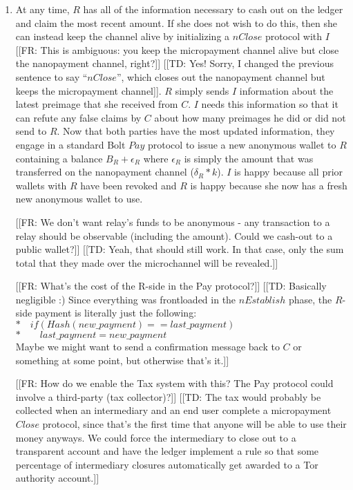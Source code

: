 \documentclass{article}
\newcommand{\flo}[1]{ {\color{blue} [[FR: #1]]}}
\newcommand{\dinh}[1]{ {\color{brown} [[TD: #1]]}}
\begin{document}
\begin{enumerate}
\item At any time, $R$ has all of the information necessary to cash out on the ledger and claim the most recent amount. If she does not wish to do this, then she can instead keep the channel alive by initializing a $nClose$ protocol with $I$ \flo{This is ambiguous: you keep the micropayment channel alive but close the nanopayment channel, right?} \dinh{Yes! Sorry, I changed the previous sentence to say ``$nClose$'', which closes out the nanopayment channel but keeps the micropayment channel}. $R$ simply sends $I$ information about the latest preimage that she received from $C$. $I$ needs this information so that it can refute any false claims by $C$ about how many preimages he did or did not send to $R$. Now that both parties have the most updated information, they engage in a standard Bolt $Pay$ protocol to issue a new anonymous wallet to $R$ containing a balance $B_R + \epsilon_R$ where $\epsilon_R$ is simply the amount that was transferred on the nanopayment channel ($\delta_R * k$). $I$ is happy because all prior wallets with $R$ have been revoked and $R$ is happy because she now has a fresh new anonymous wallet to use.

\flo{We don't want relay's funds to be anonymous - any transaction to a relay should be observable (including the amount). Could we cash-out to a public wallet?}
\dinh{Yeah, that should still work. In that case, only the sum total that they made over the microchannel will be revealed.}

\flo{What's the cost of the R-side in the Pay protocol?}
\dinh{Basically negligible :) Since everything was frontloaded in the $nEstablish$ phase, the $R$-side payment is literally just the following: \\
$*\quad if(Hash(new\_payment) == last\_payment)$ \\
$*\qquad last\_payment = new\_payment$ \\
Maybe we might want to send a confirmation message back to $C$ or something at some point, but otherwise that's it.}

\flo{How do we enable the Tax system with this? The Pay protocol could involve a third-party (tax collector)?}
\dinh{The tax would probably be collected when an intermediary and an end user complete a micropayment $Close$ protocol, since that's the first time that anyone will be able to use their money anyways. We could force the intermediary to close out to a transparent account and have the ledger implement a rule so that some percentage of intermediary closures automatically get awarded to a Tor authority account.}


\end{enumerate}
\end{document}
